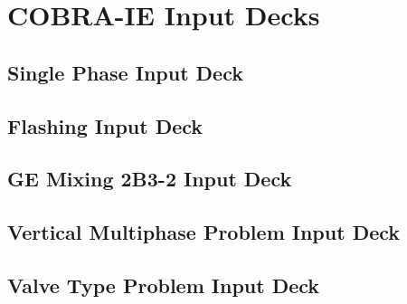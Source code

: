 \chapter{COBRA-IE Input Decks}
\label{app:input_decks}

\section{Single Phase Input Deck}

\section{Flashing Input Deck}

\section{GE Mixing 2B3-2 Input Deck}

\section{Vertical Multiphase Problem Input Deck}

\section{Valve Type Problem Input Deck}
